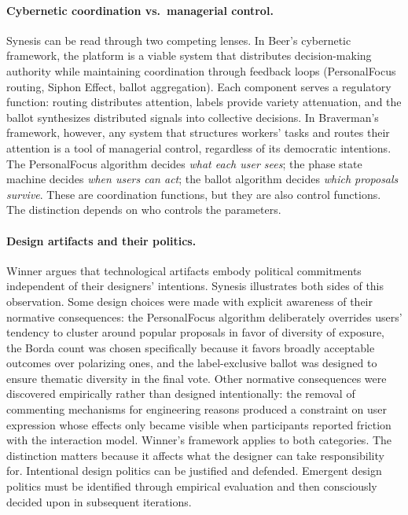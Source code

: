 \documentclass[a4paper, 12pt, twoside]{iviathesis}
\begin{document}
\paragraph{Cybernetic coordination vs.\ managerial control.}
Synesis can be read through two competing lenses. In Beer's \cite{beer1974designing} cybernetic framework, the platform is a viable system that distributes decision-making authority while maintaining coordination through feedback loops (PersonalFocus routing, Siphon Effect, ballot aggregation). Each component serves a regulatory function: routing distributes attention, labels provide variety attenuation, and the ballot synthesizes distributed signals into collective decisions. In Braverman's \cite{braverman1974} framework, however, any system that structures workers' tasks and routes their attention is a tool of managerial control, regardless of its democratic intentions. The PersonalFocus algorithm decides \textit{what each user sees}; the phase state machine decides \textit{when users can act}; the ballot algorithm decides \textit{which proposals survive}. These are coordination functions, but they are also control functions. The distinction depends on who controls the parameters.

\paragraph{Design artifacts and their politics.}
Winner \cite{winner1980} argues that technological artifacts embody political commitments independent of their designers' intentions. Synesis illustrates both sides of this observation. Some design choices were made with explicit awareness of their normative consequences: the PersonalFocus algorithm deliberately overrides users' tendency to cluster around popular proposals in favor of diversity of exposure, the Borda count was chosen specifically because it favors broadly acceptable outcomes over polarizing ones, and the label-exclusive ballot was designed to ensure thematic diversity in the final vote. Other normative consequences were discovered empirically rather than designed intentionally: the removal of commenting mechanisms for engineering reasons produced a constraint on user expression whose effects only became visible when participants reported friction with the interaction model. Winner's framework applies to both categories. The distinction matters because it affects what the designer can take responsibility for. Intentional design politics can be justified and defended. Emergent design politics must be identified through empirical evaluation and then consciously decided upon in subsequent iterations.
\end{document}

